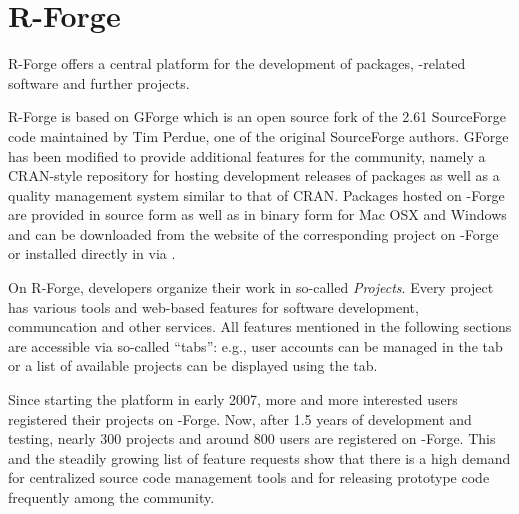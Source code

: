 \section{R-Forge}
R-Forge offers a central platform for the development of \R{}
packages, \R{}-related software and further projects. 

R-Forge is based on GForge \citep{forge:copeland_et_al:2006} which is
an open source fork of the 2.61 SourceForge code maintained by Tim
Perdue, one of the original SourceForge authors. GForge has been
modified to provide additional features for the \R{} community, namely
a CRAN-style repository for hosting development releases of \R{}
packages as well as a quality management system similar to that of
CRAN.
Packages hosted on \R{}-Forge are provided in source form as well as
in binary form for Mac OSX and Windows and can be downloaded from the
website of the corresponding project on \R{}-Forge or installed
directly in \R{} via .






On R-Forge, developers organize their work
in so-called \textit{Projects}. Every project has various tools and
web-based features for software development, communcation and other
services. All features mentioned in the 
following sections are accessible via so-called 
``tabs'': e.g., user accounts can be managed in the  tab or
a list of available projects can be displayed using the
 tab.

Since starting the platform in early 2007, more
and more interested users registered their projects on
\R{}-Forge. Now, after 1.5 years of development and testing, nearly
300 projects and around 800 
users are registered on \R{}-Forge. This and the steadily growing list of
feature requests show that there is a high demand for centralized source code
management tools and for releasing prototype code frequently among the
\R{} community.

